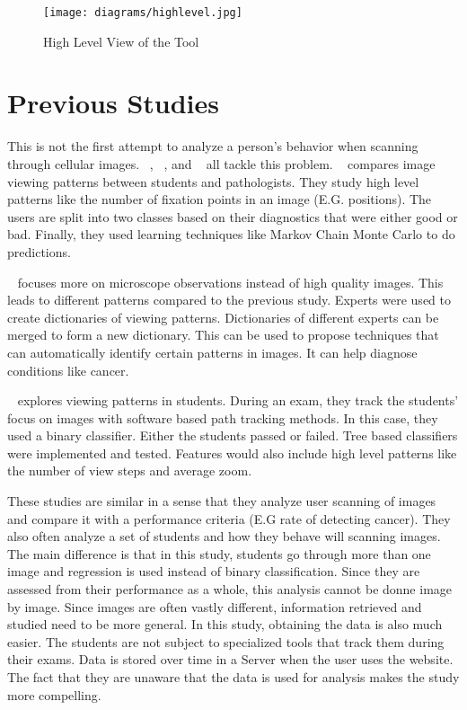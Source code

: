 \documentclass[a4paper,11pt]{report}
\numberwithin{figure}{chapter} %
\begin{document}
      \begin{figure}[H]
      \centering
      \texttt{[image: diagrams/highlevel.jpg]}
      \caption{High Level View of the Tool}
      \label{fig:highlevel}
      \end{figure}

\section{Previous Studies}

This is not the first attempt to analyze a person's behavior when scanning through cellular images.
~\cite{pathedex}, ~\cite{pathexams}, and ~\cite{pathinterations} all tackle this problem.
~\cite{pathedex} compares image viewing patterns between students and pathologists.
They study high level patterns like the number of fixation points in an image (E.G. positions).
The users are split into two classes based on their diagnostics that were either good or bad.
Finally, they used learning techniques like Markov Chain Monte Carlo to do predictions.

~\cite{pathinterations} focuses more on microscope observations instead of high quality images.
This leads to different patterns compared to the previous study.
Experts were used to create dictionaries of viewing patterns.
Dictionaries of different experts can be merged to form a new dictionary.
This can be used to propose techniques that can automatically identify certain patterns in images.
It can help diagnose conditions like cancer.

~\cite{pathexams} explores viewing patterns in students.
During an exam, they track the students' focus on images with software based  path tracking methods.
In this case, they used a binary classifier.
Either the students passed or failed.
Tree based classifiers were implemented and tested.
Features would also include high level patterns like the number of view steps and average zoom.

These studies are similar in a sense that they analyze user scanning of images and compare it with a performance criteria (E.G rate of detecting cancer).
They also often analyze a set of students and how they behave will scanning images.
The main difference is that in this study, students go through more than one image and regression is used instead of binary classification.
Since they are assessed from their performance as a whole, this analysis cannot be donne image by image.
Since images are often vastly different, information retrieved and studied need to be more general.
In this study, obtaining the data is also much easier.
The students are not subject to specialized tools that track them during their exams.
Data is stored over time in a Server when the user uses the website.
The fact that they are unaware that the data is used for analysis makes the study more compelling.
\end{document}
